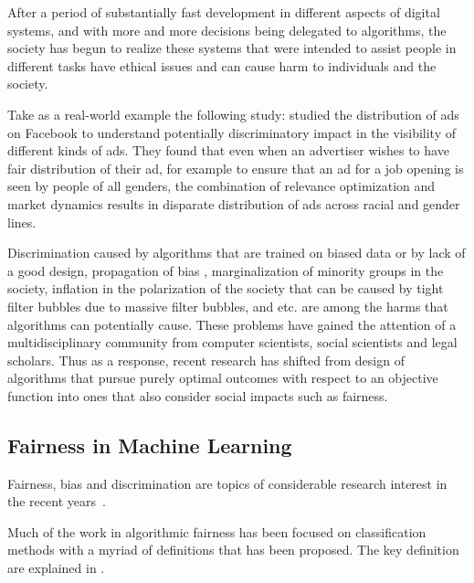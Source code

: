
After a period of substantially fast development in different aspects of digital systems, and with more and more decisions being delegated to algorithms, the society has begun to realize these systems that were intended to assist people in different tasks have ethical issues and can cause harm to individuals and the society.


Take as a real-world example the following study: \cite{1Muhammad2019facebookads} studied the distribution of ads on Facebook to understand potentially discriminatory impact in the visibility of different kinds of ads. They found that even when an advertiser wishes to have fair distribution of their ad, for example to ensure that an ad for a job opening is seen by people of all genders, the combination of relevance optimization and market dynamics results in disparate distribution of ads across racial and gender lines. 

Discrimination caused by algorithms that are trained on biased data or by lack of a good design, propagation of bias \cite{barocas2016big}, marginalization of minority groups in the society, inflation in the polarization of the society that can be caused by tight filter bubbles due to massive filter bubbles, and etc. are among the harms that algorithms can potentially cause. These problems have gained the attention of a multidisciplinary community from computer scientists, social scientists and legal scholars. Thus as a response, recent research has shifted from design of algorithms that pursue purely optimal outcomes with respect to an objective function into ones that also consider social impacts such as fairness.

\subsection{Fairness in Machine Learning}
Fairness, bias and discrimination are topics of considerable research interest in the recent years~\cite{pedreshi2008discrimination,fairness,bozdag_bias_2013}.

Much of the work in algorithmic fairness has been focused on classification methods with a myriad of definitions that has been proposed. %
The key definition are explained in \cite{mitchell2021algorithmic}.

